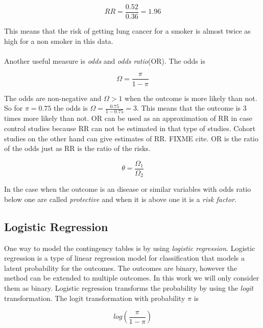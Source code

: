 \documentclass[10pt,a4paper]{report}
\begin{document}
\begin{equation}
RR=\frac{0.52}{0.36}=1.96
\end{equation}

This means that the risk of getting lung cancer for a smoker is almost twice as high for a non smoker in this data.\\
\\
Another useful measure is \emph{odds} and \emph{odds ratio}(OR). The odds is\cite{agresti_categorical} 

\begin{equation}\label{eq:odds}
\Omega=\frac{\pi}{1-\pi}
\end{equation}

The odds are non-negative and $\Omega>1$ when the outcome is more likely than not\cite{agresti_categorical}. So for $\pi=0.75$ the odds is $\Omega=\frac{0.75}{1-0.75}=3$. This means that the outcome is 3 times more likely than not. OR can be used as an approximation of RR in case control studies because RR can not be estimated in that type of studies\cite{or_mislead}. Cohort studies on the other hand can give estimates of RR. FIXME cite\cite{}. OR is the ratio of the odds just as RR is the ratio of the risks\cite{agresti_categorical}.

\begin{equation}\label{eq:odds_ratio}
\theta=\frac{\Omega_1}{\Omega_2}
\end{equation}

In the case when the outcome is an disease or similar variables with odds ratio below one are called \emph{protective} and when it is above one it is a \emph{risk factor}\cite{recoding_2011}.

\subsection{Logistic Regression}
One way to model the contingency tables is by using \emph{logistic regression}. Logistic regression is a type of linear regression model for classification that models a latent probability for the outcomes. The outcomes are binary, however the method can be extended to multiple outcomes. In this work we will only consider them as binary. Logistic regression transforms the probability by using the \emph{logit} transformation. The logit transformation with probability $\pi$ is \cite{agresti_categorical}

\begin{equation}\label{eq:logit}
log(\frac{\pi}{1-\pi})
\end{equation}
\end{document}
